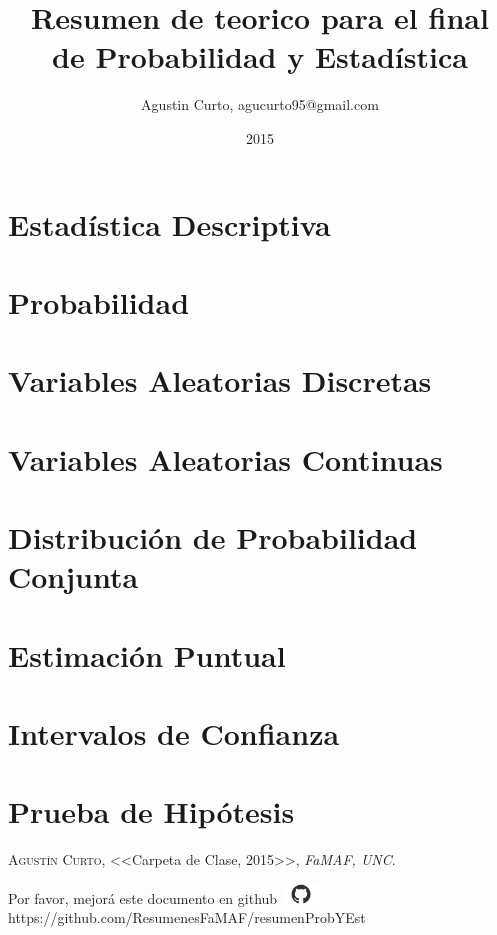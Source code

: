 \documentclass[12pt,a4paper]{report}
\author{Agustin Curto, agucurto95@gmail.com}
\title{Resumen de teorico para el final \\ de Probabilidad y Estadística}
\date{2015}
\begin{document}
\maketitle
\tableofcontents

\chapter{Estadística Descriptiva}
\chapter{Probabilidad}
\chapter{Variables Aleatorias Discretas}
\chapter{Variables Aleatorias Continuas}
\chapter{Distribución de Probabilidad Conjunta}
\chapter{Estimación Puntual}
\chapter{Intervalos de Confianza}
\chapter{Prueba de Hipótesis}



\begin{thebibliography}{X}
 \textsc{Agustín Curto},
<<Carpeta de Clase, 2015>>,
\textit{FaMAF, UNC}.
\end{thebibliography}

\vspace{\fill}
\begin{center}
Por favor, mejorá este documento en github
\includegraphics[width=1cm]{graphics/github.png} \\
https://github.com/ResumenesFaMAF/resumenProbYEst
\end{center}
\end{document}
